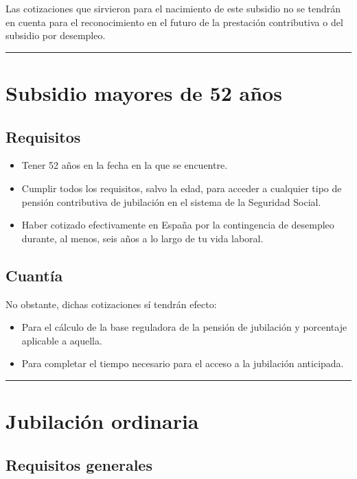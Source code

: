 \documentclass{article}
\begin{document}
	Las cotizaciones que sirvieron para el nacimiento de este subsidio no se tendrán en cuenta para el reconocimiento en el futuro de la prestación contributiva o del subsidio por desempleo.
	
	\bigskip
	
	\hrule
	
	\section*{Subsidio mayores de 52 años}
	
	\subsection*{Requisitos}
	
	\begin{itemize}
		\item Tener 52 años en la fecha en la que se encuentre.
		\item Cumplir todos los requisitos, salvo la edad, para acceder a cualquier tipo de pensión contributiva de jubilación en el sistema de la Seguridad Social.
		\item Haber cotizado efectivamente en España por la contingencia de desempleo durante, al menos, seis años a lo largo de tu vida laboral.
	\end{itemize}
	
	\subsection*{Cuantía}
	
	No obstante, dichas cotizaciones sí tendrán efecto:
	
	\begin{itemize}
		\item Para el cálculo de la base reguladora de la pensión de jubilación y porcentaje aplicable a aquella.
		\item Para completar el tiempo necesario para el acceso a la jubilación anticipada.
	\end{itemize}
	
	\bigskip
	
	\hrule
	
	\section*{Jubilación ordinaria}
	
	\subsection*{Requisitos generales}
	
\end{document}

